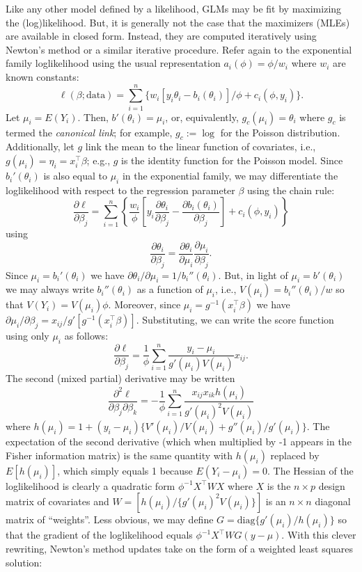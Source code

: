 \documentclass[
]{book}
\begin{document}
Like any other model defined by a likelihood, GLMs may be fit by maximizing the (log)likelihood. But, it is generally not the case that the maximizers (MLEs) are available in closed form. Instead, they are computed iteratively using Newton's method or a similar iterative procedure. Refer again to the exponential family loglikelihood using the usual representation \(a_i(\phi) = \phi/w_i\) where \(w_i\) are known constants:
\[\ell(\beta;\text{data}) = \sum_{i=1}^n \{w_i[y_i\theta_i - b_i(\theta_i)]/\phi + c_i(\phi, y_i)\}.\]
Let \(\mu_i = E(Y_i)\). Then, \(b'(\theta_i) = \mu_i\), or, equivalently, \(g_c(\mu_i) = \theta_i\) where \(g_c\) is termed the \emph{canonical link}; for example, \(g_c := \log\) for the Poisson distribution. Additionally, let \(g\) link the mean to the linear function of covariates, i.e., \(g(\mu_i) = \eta_i = x_i^\top\beta\); e.g., \(g\) is the identity function for the Poisson model. Since \(b_i'(\theta_i)\) is also equal to \(\mu_i\) in the exponential family, we may differentiate the loglikelihood with respect to the regression parameter \(\beta\) using the chain rule:
\[\frac{\partial \ell}{\partial \beta_j} = \sum_{i=1}^n \left\{\frac{w_i}{\phi}\left[y_i\frac{\partial \theta_i}{\partial\beta_j} - \frac{\partial b_i(\theta_i)}{\partial \beta_j}\right] + c_i(\phi, y_i)\right\}\]
using
\[\frac{\partial \theta_i}{\partial \beta_j} = \frac{\partial \theta_i}{\partial \mu_i}\frac{\partial \mu_i}{\partial \beta_j}.\]
Since \(\mu_i = b_i'(\theta_i)\) we have \(\partial \theta_i/\partial \mu_i = 1/b_i''(\theta_i)\). But, in light of \(\mu_i = b'(\theta_i)\) we may always write \(b_i''(\theta_i)\) as a function of \(\mu_i\), i.e., \(V(\mu_i) = b_i''(\theta_i)/w\) so that \(V(Y_i) = V(\mu_i)\phi\). Moreover, since \(\mu_i = g^{-1}(x_i^\top \beta)\) we have \(\partial\mu_i/\partial \beta_j = x_{ij}/g'[g^{-1}(x_i^\top \beta)]\). Substituting, we can write the score function using only \(\mu_i\) as follows:
\[\frac{\partial \ell}{\partial \beta_j} = \frac{1}{\phi}\sum_{i=1}^n \frac{y_i - \mu_i}{g'(\mu_i)V(\mu_i)}x_{ij}.\]
The second (mixed partial) derivative may be written
\[\frac{\partial^2 \ell}{\partial \beta_j\partial\beta_k} = -\frac{1}{\phi}\sum_{i=1}^n \frac{x_{ij}x_{ik}h(\mu_i)}{g'(\mu_i)^2V(\mu_i)}\]
where \(h(\mu_i) = 1+(y_i-\mu_i)\{V'(\mu_i)/V(\mu_i) + g''(\mu_i)/g'(\mu_i)\}\). The expectation of the second derivative (which when multiplied by -1 appears in the Fisher information matrix) is the same quantity with \(h(\mu_i)\) replaced by \(E[h(\mu_i)]\), which simply equals 1 because \(E(Y_i - \mu_i) = 0\).
The Hessian of the loglikelihood is clearly a quadratic form \(\phi^{-1}X^\top WX\) where \(X\) is the \(n\times p\) design matrix of covariates and \(W = [h(\mu_i)/\{g'(\mu_i)^2V(\mu_i)\}]\) is an \(n\times n\) diagonal matrix of ``weights''. Less obvious, we may define \(G = \text{diag}\{g'(\mu_i)/h(\mu_i)\}\) so that the gradient of the loglikelihood equals \(\phi^{-1}X^\top WG(y - \mu)\). With this clever rewriting, Newton's method updates take on the form of a weighted least squares solution:
\end{document}
